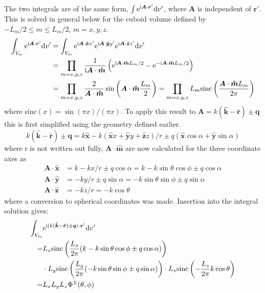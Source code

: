 \documentclass[11pt,twoside]{eitExjobb}
\begin{document}
	The two integrals are of the same form, $\int \mathrm{e}^{\mathrm{i} \bm{A} \cdot \bm{r}'} \mathrm{d}v'$, where $\bm{A}$ is independent of $\bm{r}'$. This is solved in general below for the cuboid volume defined by $-L_m/2 \leq m \leq L_m/2$, $m = x,y,z$.
	\begin{equation*}
	\begin{split}
		\int_{V_{\mathrm{sc}}} \mathrm{e}^{\mathrm{i} \bm{A} \cdot \bm{r}'} \mathrm{d}v' &=
		\int_{V_{\mathrm{sc}}} \mathrm{e}^{\mathrm{i} \bm{A} \cdot \bm{\hat{x}} x'} \mathrm{e}^{\mathrm{i} \bm{A} \cdot \bm{\hat{y}} y'} \mathrm{e}^{\mathrm{i} \bm{A} \cdot \bm{\hat{z}} z'} \mathrm{d}v' \\
		&= \prod_{m = x,y,z} \frac{1}{\mathrm{i} \bm{A} \cdot \bm{\hat{m}}} \left( \mathrm{e}^{\mathrm{i} \bm{A} \cdot \bm{\hat{m}} L_m/2} - \mathrm{e}^{-\mathrm{i} \bm{A} \cdot \bm{\hat{m}} L_m/2} \right) \\
		&= \prod_{m = x,y,z} \frac{2}{\bm{A} \cdot \bm{\hat{m}}} \sin \left(\bm{A} \cdot \bm{\hat{m}} \frac{L_m}{2} \right) 
		= \prod_{m = x,y,z} L_m \text{sinc} \left( \frac{\bm{A} \cdot \bm{\hat{m}} L_m}{2\pi} \right)
	\end{split}
	\end{equation*}
	where sinc$(x) = \sin(\pi x)/(\pi x)$. To apply this result to $\bm{A} = k(\bm{\hat{k}} - \bm{\hat{r}}) \pm \bm{q}$ this is first simplified using the geometry defined earlier.
	\begin{equation*}
		k(\bm{\hat{k}} - \bm{\hat{r}}) \pm \bm{q} = k\bm{\hat{x}} - k(\bm{\hat{x}} x + \bm{\hat{y}} y + \bm{\hat{z}} z)/r \pm q(\bm{\hat{x}} \cos{\alpha} + \bm{\hat{y}} \sin{\alpha})
	\end{equation*}
	where r is not written out fully. $\bm{A} \cdot \bm{\hat{m}}$ are now calculated for the three coordinate axes as
	\begin{equation} 
	\begin{split}
		\bm{A} \cdot \bm{\hat{x}} &= k - kx/r \pm q\cos{\alpha} = k - k\sin{\theta}\cos{\phi} \pm q\cos{\alpha} \\
		\bm{A} \cdot \bm{\hat{y}} &= - ky/r \pm q\sin{\alpha} = - k\sin{\theta}\sin{\phi} \pm q\sin{\alpha} \\
		\bm{A} \cdot \bm{\hat{z}} &= -kz/r = -k\cos{\theta}
	\end{split}
	\label{eq:radar-Aproj}
	\end{equation}
	where a conversion to spherical coordinates was made. Insertion into the integral solution gives:
	\begin{equation}
		\begin{split} 
			\int_{V_{\mathrm{sc}}} &\mathrm{e}^{\mathrm{i} (	k(\bm{\hat{k}} - \bm{\hat{r}}) \pm \bm{q}) \cdot \bm{r}'} \mathrm{d}v' \\
			=& L_{x} \text{sinc} \left( \frac{L_{x}}{2\pi} ( k - k\sin{\theta}\cos{\phi} \pm q\cos{\alpha} ) \right) \\
			&\cdot L_{y} \text{sinc} \left( \frac{L_{y}}{2\pi} ( - k\sin{\theta}\sin{\phi} \pm q\sin{\alpha} ) \right)
			\cdot L_{z} \text{sinc} \left( -\frac{L_{z}}{2\pi} k\cos{\theta} \right) \\
			=& L_{x} L_{y} L_{z} \Phi^\pm (\theta,\phi)
		\end{split}
		\label{eq:radar-intsol}
	\end{equation}
\end{document}
